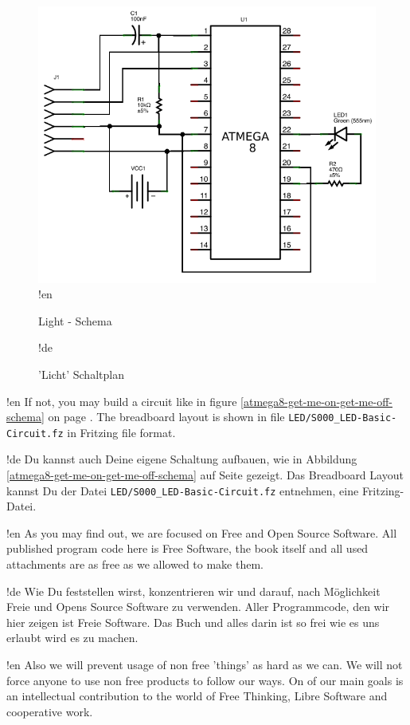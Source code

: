 \documentclass[twoside,12pt,authoryear,openright,a4paper]{book}
\begin{document}
\begin{figure}[htbp]
  \centering
  \includegraphics[width=120mm]{LED/S000_let-there-be-light_Circuit_schema.png}
!en  \caption{Light - Schema}
!de  \caption{'Licht' Schaltplan}
  \label{atmega8-let-there-be-light-schema}
\end{figure}

!en If not, you may build a circuit like in figure \ref{atmega8-get-me-on-get-me-off-schema} on page \pageref{atmega8-get-me-on-get-me-off-schema}. The breadboard layout is shown in file \texttt{LED/S000\_LED-Basic-Circuit.fz} in Fritzing file format.

!de Du kannst auch Deine eigene Schaltung aufbauen, wie in Abbildung \ref{atmega8-get-me-on-get-me-off-schema} auf Seite \pageref{atmega8-get-me-on-get-me-off-schema} gezeigt. Das Breadboard Layout kannst Du der Datei \texttt{LED/S000\_LED-Basic-Circuit.fz} entnehmen, eine Fritzing-Datei.



!en As you may find out, we are focused on Free and Open Source Software. All published program code here is Free Software, the book itself and all used attachments are as free as we allowed to make them.

!de Wie Du feststellen wirst, konzentrieren wir und darauf, nach Möglichkeit Freie und Opens Source Software zu verwenden. Aller Programmcode, den wir hier zeigen ist Freie Software. Das Buch und alles darin ist so frei wie es uns erlaubt wird es zu machen.



!en Also we will prevent usage of non free 'things' as hard as we can. We will not force anyone to use non free products to follow our ways. On of our main goals is an intellectual contribution to the world of Free Thinking, Libre Software and cooperative work.
\end{document}

